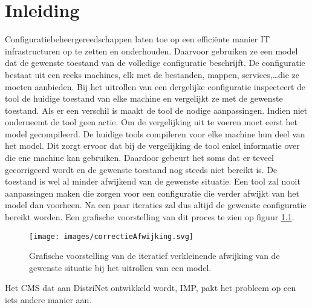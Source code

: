 \chapter{Inleiding}
\label{inleiding}
Configuratiebeheergereedschappen laten toe op een effici\"ente manier IT infrastructuren op te zetten en onderhouden.
Daarvoor gebruiken ze een model dat de gewenste toestand van de volledige configuratie beschrijft.
De configuratie bestaat uit een reeks machines, elk met de bestanden, mappen, services,\ldots die ze moeten aanbieden.
Bij het uitrollen van een dergelijke configuratie inspecteert de tool de huidige toestand van elke machine en vergelijkt ze met de gewenste
toestand.
Als er een verschil is maakt de tool de nodige aanpassingen. Indien niet onderneemt de tool geen actie.
Om de vergelijking uit te voeren moet eerst het model gecompileerd.
De huidige tools compileren voor elke machine hun deel van het model.
Dit zorgt ervoor dat bij de vergelijking de tool enkel informatie over die ene machine kan gebruiken.
Daardoor gebeurt het soms dat er teveel gecorrigeerd wordt en de gewenste toestand nog steeds niet bereikt is.
De toestand is wel al minder afwijkend van de gewenste situatie.
Een tool zal nooit aanpassingen maken die zorgen voor een configuratie die verder afwijkt van het model dan voorheen.
Na een paar iteraties zal dus altijd de gewenste configuratie bereikt worden.
Een grafische voorstelling van dit proces te zien op figuur \ref{fig:correctieAfwijking}.

\begin{figure}[p]
    \centering
    \texttt{[image: images/correctieAfwijking.svg]}
    \caption{Grafische voorstelling van de iteratief verkleinende afwijking van de gewenste situatie bij het uitrollen van een model.}
    \label{fig:correctieAfwijking}
\end{figure}

Het CMS dat aan DistriNet ontwikkeld wordt, IMP, pakt het probleem op een iets andere manier aan.



